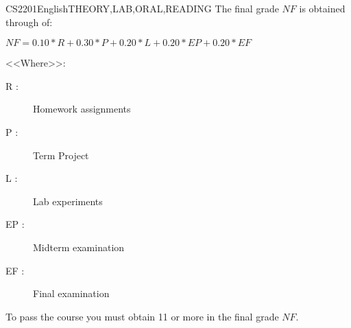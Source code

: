 \begin{evaluation}{CS2201}{English}{THEORY,LAB,ORAL,READING}
The final grade $NF$ is obtained through of:

 $ NF =  0.10*R + 0.30*P + 0.20*L + 0.20*EP + 0.20*EF $

\noindent <<Where>>:
\begin{description}
   \item[R :] Homework assignments
   \item[P :] Term Project
   \item[L :] Lab experiments
   \item[EP :] Midterm examination
   \item[EF :] Final examination
\end{description}

\noindent To pass the course you must obtain 11 or more in the final grade $NF$.
\end{evaluation}

